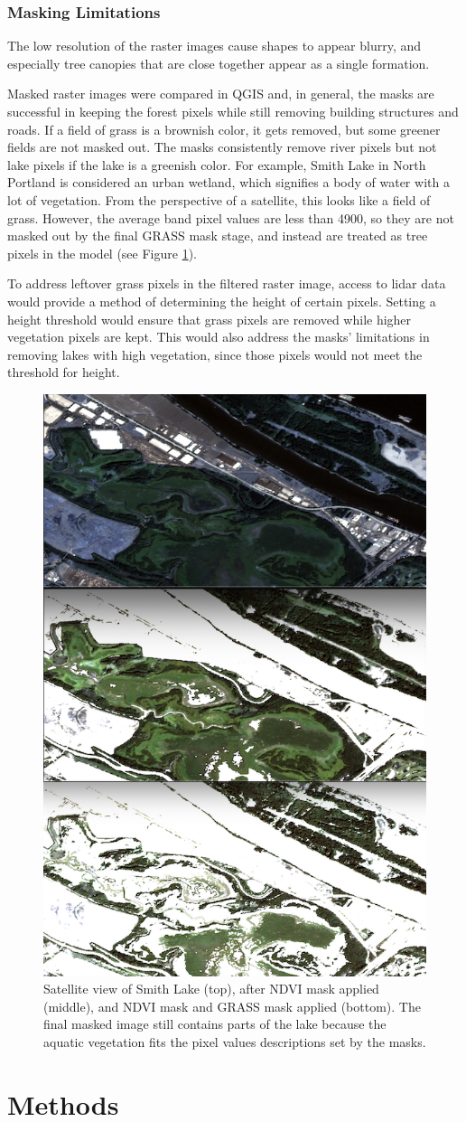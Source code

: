 \documentclass[12pt,twoside]{reedthesis}
\begin{document}
\hypertarget{masking-limitations}{%
\subsection{Masking Limitations}\label{masking-limitations}}

The low resolution of the raster images cause shapes to appear blurry, and especially tree canopies that are close together appear as a single formation.

Masked raster images were compared in QGIS and, in general, the masks are successful in keeping the forest pixels while still removing building structures and roads. If a field of grass is a brownish color, it gets removed, but some greener fields are not masked out. The masks consistently remove river pixels but not lake pixels if the lake is a greenish color. For example, Smith Lake in North Portland is considered an urban wetland, which signifies a body of water with a lot of vegetation. From the perspective of a satellite, this looks like a field of grass. However, the average band pixel values are less than 4900, so they are not masked out by the final GRASS mask stage, and instead are treated as tree pixels in the model (see Figure \ref{fig:masklimit}).

To address leftover grass pixels in the filtered raster image, access to lidar data would provide a method of determining the height of certain pixels. Setting a height threshold would ensure that grass pixels are removed while higher vegetation pixels are kept. This would also address the masks' limitations in removing lakes with high vegetation, since those pixels would not meet the threshold for height.
\begin{figure}

{\centering \includegraphics[width=0.4\linewidth]{figure/masklimit} 

}

\caption{Satellite view of Smith Lake (top), after NDVI mask applied (middle), and NDVI mask and GRASS mask applied (bottom). The final masked image still contains parts of the lake because the aquatic vegetation fits the pixel values descriptions set by the masks.}\label{fig:masklimit}
\end{figure}
\hypertarget{methods}{%
\chapter{Methods}\label{methods}}
\end{document}
